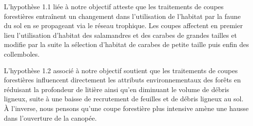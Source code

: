L'hypothèse 1.1 liée à notre objectif atteste que les traitements de coupes forestières entraînent un changement dans l'utilisation de l'habitat par la faune du sol en se propageant via le réseau trophique. 
Les coupes affectent en premier lieu l'utilisation d'habitat des salamandres et des carabes de grandes tailles et modifie par la suite la sélection d'habitat de carabes de petite taille puis enfin des collemboles. 

L'hypothèse 1.2 associé à notre objectif soutient que les traitements de coupes forestières influencent directement les attributs environnementaux des forêts en 
réduisant la profondeur de litière ainsi qu'en diminuant le volume de débris ligneux, suite à une baisse de recrutement de feuilles et de débris ligneux au sol. 
À l'inverse, nous pensons qu'une coupe forestière plus intensive amène une hausse dans l'ouverture de la canopée.


\cleardoublepage



